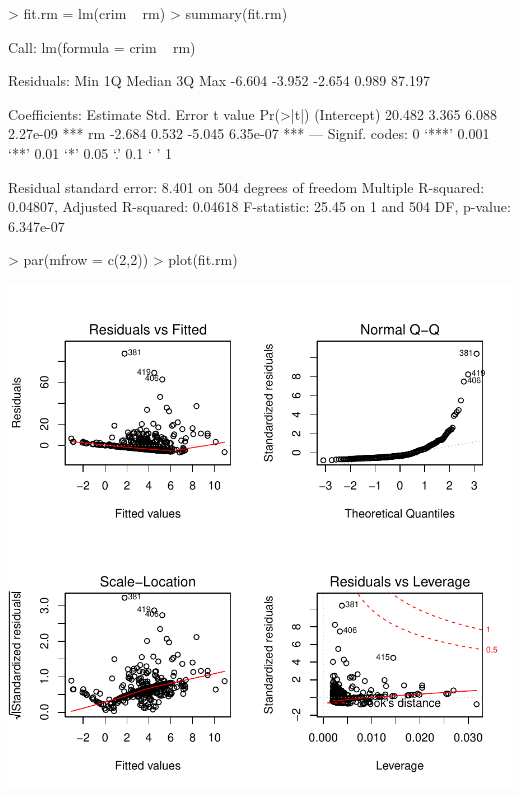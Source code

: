 \documentclass[a4paper]{article}
\begin{document}
\begin{Schunk}
\begin{Sinput}
> fit.rm = lm(crim ~ rm)
> summary(fit.rm)
\end{Sinput}
\begin{Soutput}
Call:
lm(formula = crim ~ rm)

Residuals:
   Min     1Q Median     3Q    Max 
-6.604 -3.952 -2.654  0.989 87.197 

Coefficients:
            Estimate Std. Error t value Pr(>|t|)    
(Intercept)   20.482      3.365   6.088 2.27e-09 ***
rm            -2.684      0.532  -5.045 6.35e-07 ***
---
Signif. codes:  0 ‘***’ 0.001 ‘**’ 0.01 ‘*’ 0.05 ‘.’ 0.1 ‘ ’ 1

Residual standard error: 8.401 on 504 degrees of freedom
Multiple R-squared:  0.04807,	Adjusted R-squared:  0.04618 
F-statistic: 25.45 on 1 and 504 DF,  p-value: 6.347e-07
\end{Soutput}
\begin{Sinput}
> par(mfrow = c(2,2))
> plot(fit.rm)
\end{Sinput}
\end{Schunk}
\includegraphics{mutivariblelm-rm}
\end{document}

